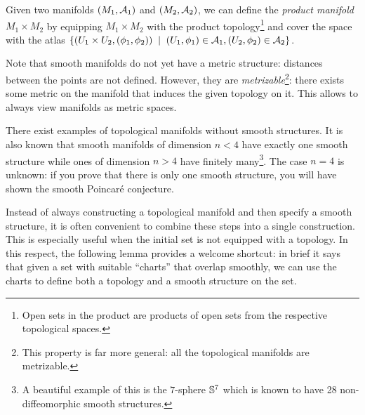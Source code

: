 \begin{example}
Given two manifolds $(M_1, \mathcal{A}_1)$ and $(M_2, \mathcal{A}_2)$, we can define the \emph{product manifold} $M_1 \times M_2$ by equipping $M_1 \times M_2$ with the product topology\footnote{Open sets in the product are products of open sets from the respective topological spaces.} and cover the space with the atlas $\{ (U_1\times U_2, (\phi_1, \phi_2)) \;\mid\; (U_1, \phi_1)\in\mathcal{A}_1, (U_2, \phi_2)\in \mathcal{A}_2\}$.
\end{example}

Note that smooth manifolds do not yet have a metric structure: distances between the points are not defined.
However, they are \emph{metrizable}\footnote{This property is far more general: all the topological manifolds are metrizable.}: there exists some metric on the manifold that induces the given topology on it.
This allows to always view manifolds as metric spaces.

\begin{remark}
	There exist examples of topological manifolds without smooth structures.
	It is also known that smooth manifolds of dimension $n < 4$ have exactly one smooth structure while ones of dimension $n > 4$ have finitely many\footnote{A beautiful example of this is the $7$-sphere $\mathbb{S}^7$ which is known to have 28 non-diffeomorphic smooth structures.}.
	The case $n = 4$ is unknown: if you prove that there is only one smooth structure, you will have shown the smooth Poincar\'e conjecture.
\end{remark}

Instead of always constructing a topological manifold and then specify a smooth structure, it is often convenient to combine these steps into a single construction.
This is especially useful when the initial set is not equipped with a topology.
In this respect, the following lemma provides a welcome shortcut: in brief it says that given a set with suitable ``charts'' that overlap smoothly, we can use the charts to define both a topology and a smooth structure on the set.

